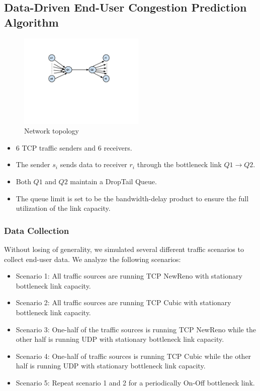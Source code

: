 \documentclass{beamer}
\begin{document}
\subsection{Data-Driven End-User Congestion Prediction Algorithm}
\begin{frame}
\begin{figure}
\centering
\includegraphics[width=6cm]{6layout.pdf}
\caption{Network topology}
\label{layout}
\end{figure}
\begin{itemize}
\item $6$ TCP traffic senders and $6$ receivers.
\item The sender $s_{i}$ sends data to receiver $r_{i}$ through the bottleneck link $Q1\to Q2$. 
\item Both $Q1$ and $Q2$ maintain a DropTail Queue. 
\item The queue limit is set to be the bandwidth-delay product to ensure the full utilization of the link capacity.
\end{itemize}
\end{frame}
\begin{frame}
\frametitle{Data Collection}
Without losing of generality, we simulated several different traffic scenarios to collect end-user data. We analyze the following scenarios: 
\begin{itemize}
    \item Scenario 1: All traffic sources are running TCP NewReno with stationary bottleneck link capacity.
    \item Scenario 2: All traffic sources are running TCP Cubic with stationary bottleneck link capacity.
    \item Scenario 3: One-half of the traffic sources is running TCP NewReno while the other half is running UDP with stationary bottleneck link capacity.
    \item Scenario 4: One-half of traffic sources is running TCP Cubic while the other half is running UDP with stationary bottleneck link capacity.
    \item Scenario 5: Repeat scenario 1 and 2 for a periodically On-Off bottleneck link.
\end{itemize}
\end{frame}
\end{document}
